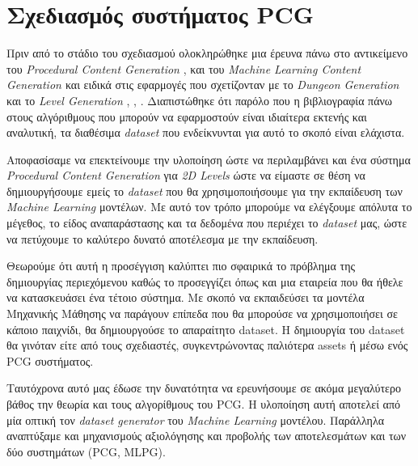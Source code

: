 \section{Σχεδιασμός συστήματος PCG}
Πριν από το στάδιο του σχεδιασμού ολοκληρώθηκε μια έρευνα πάνω στο αντικείμενο του \textit{Procedural Content Generation} \cite{answersetforpcg} \cite{constrainedsearchpcg} \cite{surrogate}, \cite{roguedream} και του  \textit{Machine Learning Content Generation \cite{mlpcg}} και ειδικά στις εφαρμογές που σχετίζονταν με το \textit{Dungeon Generation} και το \textit{Level Generation} \cite{cellular}, \cite{missions}, \cite{platform}. Διαπιστώθηκε ότι παρόλο που η βιβλιογραφία πάνω στους αλγόριθμους που μπορούν να εφαρμοστούν είναι ιδιαίτερα εκτενής και αναλυτική, τα διαθέσιμα \textit{dataset} που ενδείκνυνται για αυτό το σκοπό είναι ελάχιστα.
\par
Αποφασίσαμε να επεκτείνουμε την υλοποίηση ώστε να περιλαμβάνει και ένα σύστημα \textit{Procedural Content Generation} για \textit{2D Levels} ώστε να είμαστε σε θέση να δημιουργήσουμε εμείς το \textit{dataset} που θα χρησιμοποιήσουμε για την εκπαίδευση των \textit{Machine Learning} μοντέλων. Με αυτό τον τρόπο μπορούμε να ελέγξουμε απόλυτα το μέγεθος, το είδος αναπαράστασης και τα δεδομένα που περιέχει το \textit{dataset} μας, ώστε να πετύχουμε το καλύτερο δυνατό αποτέλεσμα με την εκπαίδευση.
\par
Θεωρούμε ότι αυτή η προσέγγιση καλύπτει πιο σφαιρικά το πρόβλημα της δημιουργίας περιεχόμενου καθώς το προσεγγίζει όπως και μια εταιρεία που θα ήθελε να κατασκευάσει ένα τέτοιο σύστημα. Με σκοπό να εκπαιδεύσει τα μοντέλα Μηχανικής Μάθησης να παράγουν επίπεδα που θα μπορούσε να χρησιμοποιήσει σε κάποιο παιχνίδι, θα δημιουργούσε το απαραίτητο dataset. Η δημιουργία του dataset θα γινόταν είτε από τους σχεδιαστές, συγκεντρώνοντας παλιότερα assets ή μέσω ενός PCG συστήματος.
\par
Ταυτόχρονα αυτό μας έδωσε την δυνατότητα να ερευνήσουμε σε ακόμα μεγαλύτερο βάθος την θεωρία και τους αλγορίθμους του PCG. Η υλοποίηση αυτή αποτελεί από μία οπτική τον \textit{dataset generator} του \textit{Machine Learning} μοντέλου. Παράλληλα αναπτύξαμε και μηχανισμούς αξιολόγησης και προβολής των αποτελεσμάτων και των δύο συστημάτων (PCG, MLPG).


